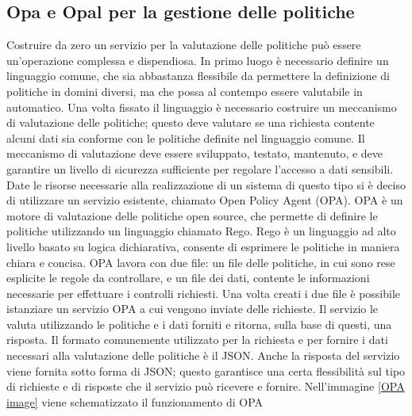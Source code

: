 \documentclass[12pt]{report}
\begin{document}
\subsection{Opa e Opal per la gestione delle politiche}
Costruire da zero un servizio per la valutazione delle politiche può essere un'operazione complessa e dispendiosa.
In primo luogo è necessario definire un linguaggio comune, che sia abbastanza flessibile da permettere la definizione di politiche in domini diversi, ma che possa al contempo essere valutabile in automatico.
Una volta fissato il linguaggio è necessario costruire un meccanismo di valutazione delle politiche; questo deve valutare se una richiesta contente alcuni dati sia conforme con le politiche definite nel linguaggio comune. 
Il meccanismo di valutazione deve essere sviluppato, testato, mantenuto, e deve garantire un livello di sicurezza sufficiente per regolare l'accesso a dati sensibili.
Date le risorse necessarie alla realizzazione di un sistema di questo tipo si è deciso di utilizzare un servizio esistente, chiamato Open Policy Agent (OPA).
OPA è un motore di valutazione delle politiche open source\cite{opa_documentation}, che permette di definire le politiche utilizzando un linguaggio chiamato Rego.
Rego è un linguaggio ad alto livello basato su logica dichiarativa, consente di esprimere le politiche in maniera chiara e concisa.
OPA lavora con due file: un file delle politiche, in cui sono rese esplicite le regole da controllare, e un file dei dati, contente le informazioni necessarie per effettuare i controlli richiesti.
Una volta creati i due file è possibile istanziare un servizio OPA a cui vengono inviate delle richieste.
Il servizio le valuta utilizzando le politiche e i dati forniti e ritorna, sulla base di questi, una risposta.
Il formato comunemente utilizzato per la richiesta e per fornire i dati necessari alla valutazione delle politiche è il JSON.
Anche la risposta del servizio viene fornita sotto forma di JSON; questo garantisce una certa flessibilità sul tipo di richieste e di risposte che il servizio può ricevere e  fornire.
Nell'immagine \ref{OPA image} viene schematizzato il funzionamento di OPA
\end{document}
